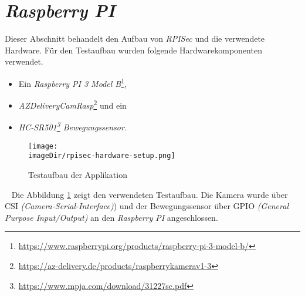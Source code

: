 \section{\emph{Raspberry PI}}
\label{sec:raspberrypi}
Dieser Abschnitt behandelt den Aufbau von \emph{RPISec} und die verwendete Hardware. Für den Testaufbau wurden folgende Hardwarekomponenten verwendet.
\begin{itemize}
	\item Ein \emph{Raspberry PI 3 Model B}\footnote{\url{https://www.raspberrypi.org/products/raspberry-pi-3-model-b/}},
	\item \emph{AZDeliveryCamRasp}\footnote{\url{https://az-delivery.de/products/raspberrykamerav1-3}} und ein
	\item \emph{HC-SR501\footnote{\url{https://www.mpja.com/download/31227sc.pdf}} Bewegungssensor}.
\end{itemize}
\begin{figure}[h]
	\centering
	\texttt{[image: \\imageDir/rpisec-hardware-setup.png]}
	\caption{Testaufbau der Applikation}
	\label{fig:image-hardware-setup}
\end{figure}
\ \newline
Die Abbildung \ref{fig:image-hardware-setup} zeigt den verwendeten Testaufbau. Die Kamera wurde über CSI \emph{(Camera-Serial-Interface)}) und der Bewegungssensor über GPIO \emph{(General Purpose Input/Output)} an den \emph{Raspberry PI} angeschlossen.

